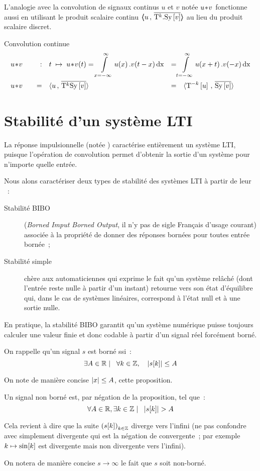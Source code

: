 L'analogie avec la convolution de signaux continus $u$ et $v$ notée
$u\!\ast\! v$ fonctionne aussi en utilisant le produit scalaire continu
$\langle\!\!\langle u\,,\,\overline{\mathrm{T}^k.\mathrm{Sy}\left[v\right]}\rangle\!\!\rangle$ au lieu du produit scalaire
discret.

\begin{definition}{Convolution continue}
  \begin{align}
    \label{eq:convolution_continue}
    &u\conv v \quad &:& \quad  t \;\mapsto\; u\conv v\de{t} =\integ{x=-\infty}{\infty}{u\de{x}.v\de{t-x}\dx} &=& \integ{t=-\infty}{\infty}{u\de{x+t}.v\de{-x}\dx} \nonumber\\
    &u\conv v & = & \quad \scal{u}{\conj{\oret^k\Sy\b{v}}} &=& \quad\scal{\oret^{-k}\b{u}}{\conj{\Sy\b{v}}} 
  \end{align}
\end{definition}


\section{Stabilité d'un système LTI}

La réponse impulsionnelle (notée \RIP) caractérise entièrement un
système LTI, puisque l'opération de convolution permet d'obtenir la
sortie d'un système pour n'importe quelle entrée.

Nous alons caractériser deux types de stabilité des systèmes LTI à
partir de leur \RIP{}~:
\begin{description}
\item[Stabilité BIBO] (\emph{Borned Imput Borned Output}, il n'y pas
  de sigle Français d'usage courant) associée à la propriété de donner
  des réponses bornées pour toutes entrée bornée~;
\item[Stabilité simple] chère aux automaticiennes qui exprime le fait
  qu'un système relâché (dont l'entrée reste nulle à partir d'un
  instant) retourne vers son état d'équilibre qui, dans le cas de
  systèmes linéaires, correspond à l'état null et à une sortie nulle.
\end{description}

En pratique, la stabilité BIBO garantit qu'un système numérique puisse
toujours calculer une valeur finie et donc codable à partir d'un
signal réel forcément borné.

\begin{remarque}
  On rappelle qu'un signal $s$ est borné ssi~:
  $$\exists A\in\mathbb{R} \mathrel{}\mid\mathrel{} \;\;{} \forall k\in \mathbb{Z}, \quad \left|s\!\left[k\right]\right|\leq A $$

  On note de manière concise $\left|x\right|\leq A$, cette proposition.

  Un signal non borné est, par négation de la proposition, tel que~:
  $$\forall A\in\mathbb{R}, \exists k\in \mathbb{Z} \mathrel{}\mid\mathrel{} \;\;  \left|s\!\left[k\right]\right| > A $$

  Cela revient à dire que la suite $\left(s\!\left[k\right]\right)_{k\in\mathbb{Z}}$ diverge
  vers l'infini (ne pas confondre avec simplement divergente qui est
  la négation de convergente~; par exemple $k\mapsto \sin\!\left[k\right]$ est
  divergente mais non divergente vers l'infini).

  On notera de manière concise $s\to\infty$ le fait que $s$ soit
  non-borné.
  
\end{remarque}

